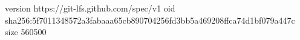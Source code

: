 version https://git-lfs.github.com/spec/v1
oid sha256:5f7011348572a3fabaaa65cb890704256fd3bb5a469208ffca74d1bf079a447c
size 560500
